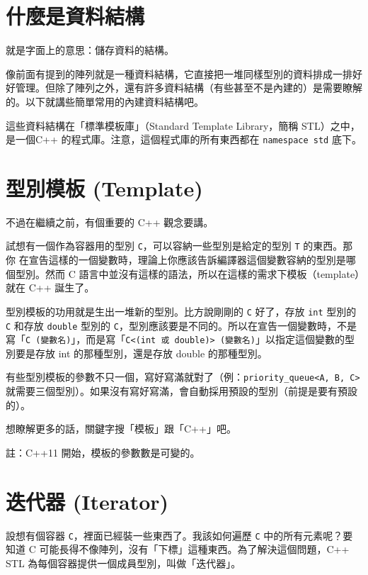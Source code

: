 \documentclass[a4paper, 11pt, oneside]{book}
\begin{document}
\section{什麼是資料結構}
就是字面上的意思：儲存資料的結構。

像前面有提到的陣列就是一種資料結構，它直接把一堆同樣型別的資料排成一排好好管理。但除了陣列之外，還有許多資料結構（有些甚至不是內建的）是需要瞭解的。以下就講些簡單常用的內建資料結構吧。

這些資料結構在「標準模板庫」（Standard Template Library，簡稱 STL）之中，是一個C++ 的程式庫。注意，這個程式庫的所有東西都在 \texttt{namespace std} 底下。

\section{型別模板 (Template)}

不過在繼續之前，有個重要的 C++ 觀念要講。

試想有一個作為容器用的型別 \texttt{C}，可以容納一些型別是給定的型別 \texttt{T} 的東西。那你
在宣告這樣的一個變數時，理論上你應該告訴編譯器這個變數容納的型別是哪個型別。然而 C 語言中並沒有這樣的語法，所以在這樣的需求下模板（template）就在 C++ 誕生了。

型別模板的功用就是生出一堆新的型別。比方說剛剛的 \texttt{C} 好了，存放 \texttt{int} 型別的 \texttt{C} 和存放 \texttt{double} 型別的 \texttt{C}，型別應該要是不同的。所以在宣告一個變數時，不是寫「\texttt{C (變數名)}」，而是寫「\texttt{C<(int 或 double)> (變數名)}」以指定這個變數的型別要是存放 int 的那種型別，還是存放 double 的那種型別。

有些型別模板的參數不只一個，寫好寫滿就對了（例：\texttt{priority\_queue<A, B, C>} 就需要三個型別）。如果沒有寫好寫滿，會自動採用預設的型別（前提是要有預設的）。

想瞭解更多的話，關鍵字搜「模板」跟「C++」吧。

註：C++11 開始，模板的參數數是可變的。

\section{迭代器 (Iterator)}

設想有個容器 \texttt{C}，裡面已經裝一些東西了。我該如何遍歷 \texttt{C} 中的所有元素呢？要知道 C 可能長得不像陣列，沒有「下標」這種東西。為了解決這個問題，C++ STL 為每個容器提供一個成員型別，叫做「迭代器」。
\end{document}
